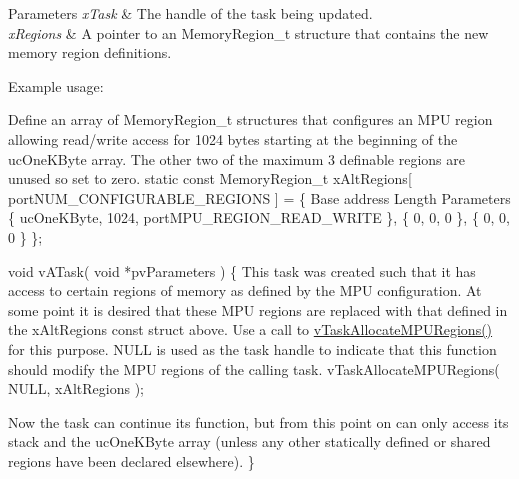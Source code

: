 \begin{DoxyParams}{Parameters}
{\em x\-Task} & The handle of the task being updated.\\
\hline
{\em x\-Regions} & A pointer to an Memory\-Region\-\_\-t structure that contains the new memory region definitions.\\
\hline
\end{DoxyParams}
Example usage\-: 
\begin{DoxyPre}
Define an array of MemoryRegion\_t structures that configures an MPU region
allowing read/write access for 1024 bytes starting at the beginning of the
ucOneKByte array.  The other two of the maximum 3 definable regions are
unused so set to zero.
static const MemoryRegion\_t xAltRegions[ portNUM\_CONFIGURABLE\_REGIONS ] =
\{
Base address        Length      Parameters
    \{ ucOneKByte,       1024,       portMPU\_REGION\_READ\_WRITE \},
    \{ 0,                0,          0 \},
    \{ 0,                0,          0 \}
\};\end{DoxyPre}



\begin{DoxyPre}void vATask( void *pvParameters )
\{
This task was created such that it has access to certain regions of
memory as defined by the MPU configuration.  At some point it is
desired that these MPU regions are replaced with that defined in the
xAltRegions const struct above.  Use a call to \hyperlink{task_8h_ad889595baff9faf9efe02f3696825409}{vTaskAllocateMPURegions()}
for this purpose.  NULL is used as the task handle to indicate that this
function should modify the MPU regions of the calling task.
    vTaskAllocateMPURegions( NULL, xAltRegions );\end{DoxyPre}



\begin{DoxyPre}Now the task can continue its function, but from this point on can only
access its stack and the ucOneKByte array (unless any other statically
defined or shared regions have been declared elsewhere).
\}
   \end{DoxyPre}
 